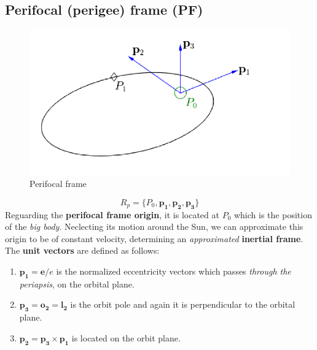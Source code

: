 \subsection{\textsf{\textbf{Perifocal (perigee) frame (PF)}}}
\begin{figure}[h]
    \centering
    \includegraphics[scale=0.5]{AerospaceApplications/images/PF.png}
    \caption{Perifocal frame}
\end{figure}
{\Large\color{blue}
\begin{equation}
    R_p = \{
        P_0, \mathbf{p_1, p_2, p_3}
    \}
\end{equation}
}
Reguarding the \textbf{perifocal frame origin}, it is located at $P_0$ which is the position of the \textit{big body}. Neclecting its motion around the Sun, we can approximate this origin to be of constant velocity, determining an \textit{approximated} \textbf{inertial frame}. 
The \textbf{unit vectors} are defined as follows:
\begin{enumerate}
    \item $\mathbf{p_1=e}/e$ is the normalized eccentricity vectors which passes \textit{through the periapsis}, on  the orbital plane. 
    \item $\mathbf{p_3=o_2=l_2}$ is the orbit pole and again it is perpendicular to the orbital plane.
    \item $\mathbf{p_2 = p_3 \times p_1}$ is located on the orbit plane.
\end{enumerate}

